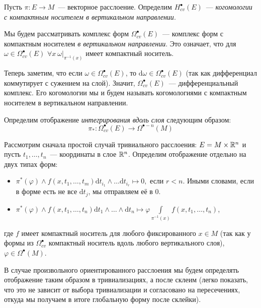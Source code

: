  	 	\begin{definition} 
 	 		Пусть $\pi\colon E \to M$~--- векторное расслоение. Определим $H^{\bullet}_{cv}(E)$~--- \emph{когомологии с компактным носителем в вертикальном направлении}. 

 	 		Мы будем рассматривать комплекс форм $\Omega^{\bullet}_{cv}(E)$~--- комплекс форм с компактным носителем \emph{в вертикальном направлении}. Это означает, что для $\omega \in \Omega^{\bullet}_{cv}(E)$ $\forall x \ \omega\vert_{\pi^{-1}(x)}$ имеет компактный носитель.  

 	 		Теперь заметим, что если $\omega \in \Omega^{\bullet}_{cv}(E)$, то $\mathrm{d} \omega \in \Omega^{\bullet}_{cv}(E)$ (так как дифференциал коммутирует с сужением на слой). Значит, $\Omega^{\bullet}_{cv}(E)$~--- дифференциальный комплекс. Его когомологии мы и будем называть когомологиями с компактным носителем в вертикальном направлении. 

 	 	\end{definition}

 	 	Определим отображение \emph{интегрирования вдоль слоя} следующим образом: 
 	 	\[
 	 		\pi_*\colon \Omega_{cv}^{\bullet}(E) \to \Omega^{\bullet - n}(M)	
 	 	\]

 	 	Рассмотрим сначала простой случай тривиального расслоения: $E = M \times \mathbb{R}^n$ и пусть $t_1, \ldots, t_n$~--- координаты в слое $\mathbb{R}^n$. Определим отображение отдельно на двух типах форм: 
 	 	\begin{itemize}
 	 		\item $\pi^*(\varphi) \wedge f(x, t_1, \ldots, t_m) \mathrm{d}t_{i_1} \wedge \ldots \mathrm{d}t_{i_r} \mapsto 0,$ если $r < n$. Иными словами, если в форме есть не все $\mathrm{d}t_j$, мы отправляем её в 0.

 	 		\item $\pi^*(\varphi) \wedge f(x, t_1, \ldots, t_n) \mathrm{d}t_1 \wedge \ldots \wedge \mathrm{d}t_n \mapsto \varphi \int\limits_{\pi^{-1}(x)} f(x, t_1, \ldots, t_n)$,
 	 	\end{itemize}
 	 	где $f$ имеет компактный носитель для любого фиксированного $ x \in M$ (так как у формы из $\Omega^{\bullet}_{cv}$ компактный носитель вдоль любого вертикального слоя), $\varphi \in \Omega^{\bullet}(M)$. 

 	 	В случае произвольного ориентированного расслоения мы будем определять отображение таким образом в тривиализациях, а после склеим (легко показать, что это не зависит от выбора тривиализации и согласовано на пересечениях, откуда мы получаем в итоге глобальную форму после склейки). 
 	 	

